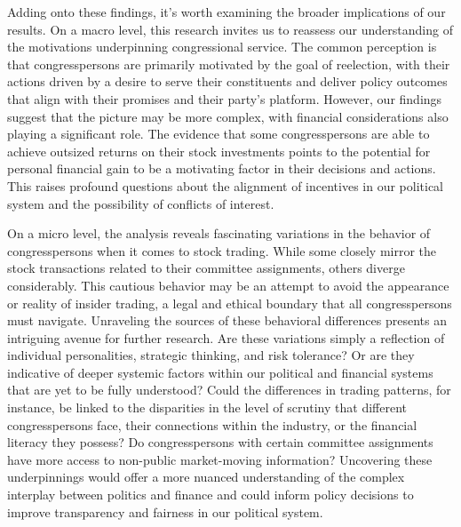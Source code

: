 \documentclass[15pt,letterpaper]{article}
\begin{document}
Adding onto these findings, it's worth examining the broader implications of our results. On a macro level, this research invites us to reassess our understanding of the motivations underpinning congressional service. The common perception is that congresspersons are primarily motivated by the goal of reelection, with their actions driven by a desire to serve their constituents and deliver policy outcomes that align with their promises and their party's platform.
However, our findings suggest that the picture may be more complex, with financial considerations also playing a significant role. The evidence that some congresspersons are able to achieve outsized returns on their stock investments points to the potential for personal financial gain to be a motivating factor in their decisions and actions. This raises profound questions about the alignment of incentives in our political system and the possibility of conflicts of interest.

On a micro level, the analysis reveals fascinating variations in the behavior of congresspersons when it comes to stock trading. While some closely mirror the stock transactions related to their committee assignments, others diverge considerably. This cautious behavior may be an attempt to avoid the appearance or reality of insider trading, a legal and ethical boundary that all congresspersons must navigate.
Unraveling the sources of these behavioral differences presents an intriguing avenue for further research. Are these variations simply a reflection of individual personalities, strategic thinking, and risk tolerance? Or are they indicative of deeper systemic factors within our political and financial systems that are yet to be fully understood?
Could the differences in trading patterns, for instance, be linked to the disparities in the level of scrutiny that different congresspersons face, their connections within the industry, or the financial literacy they possess? Do congresspersons with certain committee assignments have more access to non-public market-moving information? Uncovering these underpinnings would offer a more nuanced understanding of the complex interplay between politics and finance and could inform policy decisions to improve transparency and fairness in our political system.

\end{document}
